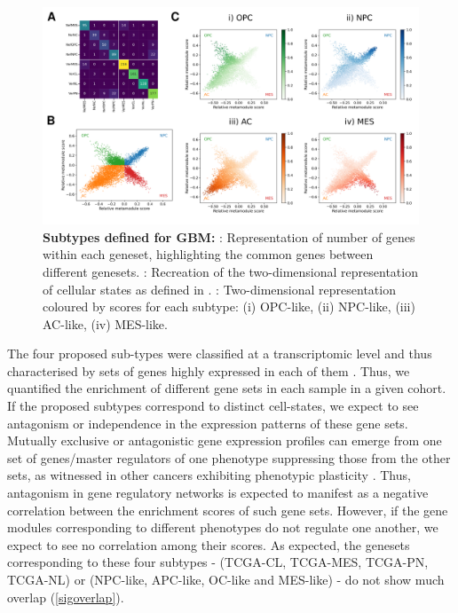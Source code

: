 \documentclass[11pt,a4paper]{article}
\begin{document}
\begin{figure}[h!]
    \begin{subfigure}[c]{\textwidth}
        \label{sigoverlap}
    \end{subfigure}
    \begin{subfigure}[c]{\textwidth}
        \label{ninjastar}
    \end{subfigure}
    \begin{subfigure}[c]{\textwidth}
        \label{4star}
    \end{subfigure}
    \centering
    \includegraphics[width=\textwidth]{Figure1}
    \caption{\textbf{Subtypes defined for GBM:} : Representation of number of genes within each geneset, highlighting the common genes between different genesets. : Recreation of the two-dimensional representation of cellular states as defined in \cite{Neftel}. : Two-dimensional representation coloured by scores for each subtype: (i) OPC-like, (ii) NPC-like, (iii) AC-like, (iv) MES-like. }
    \label{introfig}
\end{figure}

The four proposed sub-types were classified at a transcriptomic level and thus characterised by sets of genes highly expressed in each of them \parencite{Neftel, Verhaak}. Thus, we quantified the enrichment of different gene sets in each sample in a given cohort. If the proposed subtypes correspond to distinct cell-states, we expect to see antagonism or independence in the expression patterns of these gene sets. Mutually exclusive or antagonistic gene expression profiles can emerge from one set of genes/master regulators of one phenotype suppressing those from the other sets, as witnessed in other cancers exhibiting phenotypic plasticity \parencite{melanomaswitch,sclcpheno}. Thus, antagonism in gene regulatory networks is expected to manifest as a negative correlation between the enrichment scores of such gene sets. However, if the gene modules corresponding to different phenotypes do not regulate one another, we expect to see no correlation among their scores. As expected, the genesets corresponding to these four subtypes - (TCGA-CL, TCGA-MES, TCGA-PN, TCGA-NL) \parencite{Verhaak} or (NPC-like, APC-like, OC-like and MES-like) \parencite{Neftel} - do not show much overlap (\autoref{sigoverlap}).
\end{document}
